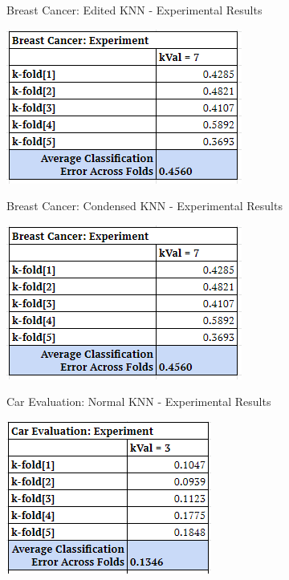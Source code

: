 \documentclass[twoside,11pt]{article}
\begin{document}
\begin{table}[h!]
	\begin{center}
		\caption{Breast Cancer: Edited KNN - Experimental Results}
		\label{tab:table2}
		\includegraphics[scale=.7]{BC_Results_EKNN}\newline
	\end{center}
\end{table}

\begin{table}[h!]
	\begin{center}
		\caption{Breast Cancer: Condensed KNN - Experimental Results}
		\label{tab:table3}
		\includegraphics[scale=.7]{BC_Results_CKNN}\newline
	\end{center}
\end{table}

\begin{table}[h!]
	\begin{center}
		\caption{Car Evaluation: Normal KNN - Experimental Results}
		\label{tab:table4}
		\includegraphics[scale=.7]{CE_Results_NKNN}\newline
	\end{center}
\end{table}
\end{document}
